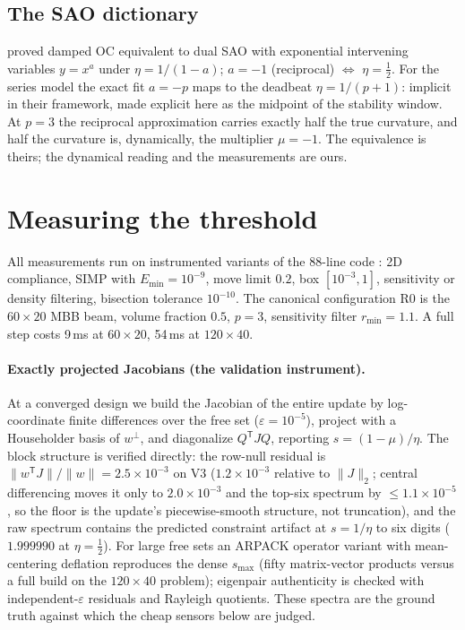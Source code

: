 \documentclass[11pt,a4paper]{article}
\newcommand{\smax}{s_{\max}}
\begin{document}
\subsection{The SAO dictionary}\label{sec:sao}

\citet{groenwold2008} proved damped OC equivalent to dual SAO with
exponential intervening variables $y=x^{a}$ under $\eta=1/(1-a)$;
$a=-1$ (reciprocal) $\Leftrightarrow$ $\eta=\tfrac12$. For the series
model the exact fit $a=-p$ maps to the deadbeat $\eta=1/(p{+}1)$:
implicit in their framework, made explicit here as the midpoint of the
stability window. At $p=3$ the reciprocal approximation carries exactly
half the true curvature, and half the curvature is, dynamically, the
multiplier $\mu=-1$. The equivalence is theirs; the dynamical reading
and the measurements are ours.

\section{Measuring the threshold}\label{sec:method}

All measurements run on instrumented variants of the 88-line code
\citep{andreassen2011top88}: 2D compliance, SIMP with
$E_{\min}=10^{-9}$, move limit $0.2$, box $[10^{-3},1]$, sensitivity or
density filtering, bisection tolerance $10^{-10}$. The canonical
configuration R0 is the $60\times20$ MBB beam, volume fraction $0.5$,
$p=3$, sensitivity filter $r_{\min}=1.1$. A full step costs 9\,ms at
$60\times20$, 54\,ms at $120\times40$.

\paragraph{Exactly projected Jacobians (the validation instrument).}
At a converged design we build the Jacobian of the entire update by
log-coordinate finite differences over the free set
($\varepsilon=10^{-5}$), project with a Householder basis of
$w^{\perp}$, and diagonalize $Q^{\mathsf T}JQ$, reporting
$s=(1-\mu)/\eta$. The block structure is verified directly: the row-null
residual is $\|w^{\mathsf T}J\|/\|w\|=2.5\times10^{-3}$ on V3
($1.2\times10^{-3}$ relative to $\|J\|_2$; central differencing moves it
only to $2.0\times10^{-3}$ and the top-six spectrum by
$\le1.1\times10^{-5}$, so the floor is the update's piecewise-smooth
structure, not truncation), and the raw spectrum contains the predicted
constraint artifact at $s=1/\eta$ to six digits ($1.999990$ at
$\eta=\tfrac12$). For large free sets an ARPACK operator variant with
mean-centering deflation reproduces the dense $\smax$ (fifty
matrix-vector products versus a full build on the $120\times40$
problem); eigenpair authenticity is checked with
independent-$\varepsilon$ residuals and Rayleigh quotients. These
spectra are the ground truth against which the cheap sensors below are
judged.
\end{document}

